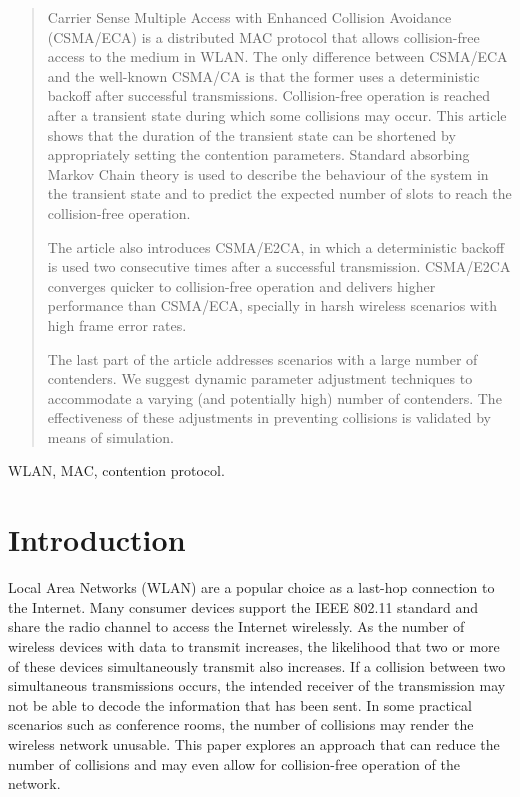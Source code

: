 \documentclass[journal]{IEEEtran}
\begin{document}
\maketitle


\begin{abstract}
Carrier Sense Multiple Access with Enhanced Collision Avoidance (CSMA/ECA) is a distributed MAC protocol that allows collision-free access to the medium in WLAN. The only difference between CSMA/ECA and the well-known CSMA/CA is that the former uses a deterministic backoff after successful transmissions. Collision-free operation is reached after a transient state during which some collisions may occur. This article shows that the duration of the transient state can be shortened by appropriately setting the contention parameters. Standard absorbing Markov Chain theory is used to describe the behaviour of the system in the transient state and to predict the expected number of slots to reach the collision-free operation. 

The article also introduces CSMA/E2CA, in which a deterministic backoff is used two consecutive times after a successful transmission. CSMA/E2CA converges quicker to collision-free operation and delivers higher performance than CSMA/ECA, specially in harsh wireless scenarios with high frame error rates.

The last part of the article addresses scenarios with a large number of contenders. We suggest dynamic parameter adjustment techniques to accommodate a varying (and potentially high) number of contenders. The effectiveness of these adjustments in preventing collisions is validated by means of simulation.



\end{abstract}


\begin{IEEEkeywords}
WLAN, MAC, contention protocol.
\end{IEEEkeywords}






\IEEEpeerreviewmaketitle



\section{Introduction}


 Local Area Networks (WLAN) are a popular choice as a last-hop connection to the Internet. Many consumer devices support the IEEE 802.11 standard \cite{IEEE80211-IEEESTD2007} and share the radio channel to access the Internet wirelessly. As the number of wireless devices with data to transmit increases, the likelihood that two or more of these devices simultaneously transmit also increases. If a collision between two simultaneous transmissions occurs, the intended receiver of the transmission may not be able to decode the information that has been sent. In some practical scenarios such as conference rooms, the number of collisions may render the wireless network unusable. This paper explores an approach that can reduce the number of collisions and may even allow for collision-free operation of the network.
\end{document}
